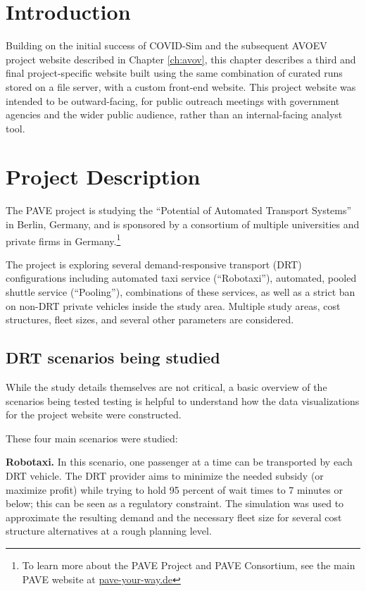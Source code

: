 \section{Introduction}
\label{pave-intro}

Building on the initial success of COVID-Sim and the subsequent AVOEV project website described in Chapter \ref{ch:avov}, this chapter describes a third and final project-specific website built using the same combination of curated runs stored on a file server, with a custom front-end website. This project website was intended to be outward-facing, for public outreach meetings with government agencies and the wider public audience, rather than an internal-facing analyst tool.

\section{Project Description}
\label{pave-project-description}

The \gls{PAVE} project is studying the ``Potential of Automated Transport Systems'' in Berlin, Germany, and is sponsored by a consortium of multiple universities and private firms in Germany.\footnote{To learn more about the PAVE Project and PAVE Consortium, see the main PAVE website at \href{https://pave-your-way.de}{pave-your-way.de}}

The project is exploring several demand-responsive transport (\gls{DRT}) configurations including automated taxi service (``Robotaxi''), automated, pooled shuttle service (``Pooling''), combinations of these services, as well as a strict ban on non-DRT private vehicles inside the study area. Multiple study areas, cost structures, fleet sizes, and several other parameters are considered.

\subsection{DRT scenarios being studied}
\label{pave-scenarios}

While the study details themselves are not critical, a basic overview of the scenarios being tested testing is helpful to understand how the data visualizations for the project website were constructed.

These four main scenarios were studied:

\textbf{Robotaxi.} In this scenario, one passenger at a time can be transported by each DRT vehicle. The DRT provider aims to minimize the needed subsidy (or maximize profit) while trying to hold 95 percent of wait times to 7 minutes or below; this can be seen as a regulatory constraint. The simulation was used to approximate the resulting demand and the necessary fleet size for several cost structure alternatives at a rough planning level.

